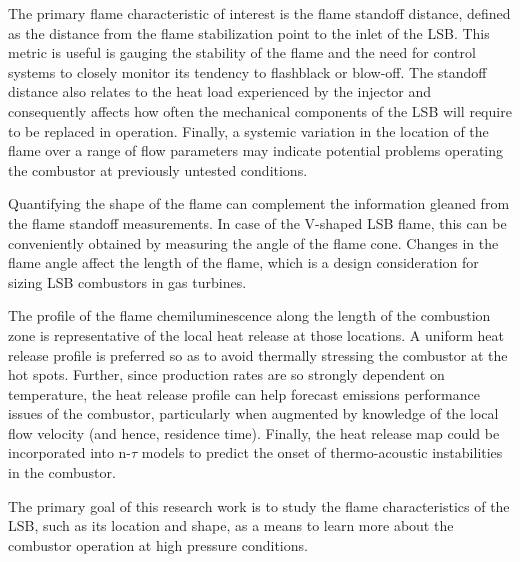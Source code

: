 The primary flame characteristic of interest is the flame standoff distance, defined as the distance from the flame stabilization point to the inlet of the LSB.
This metric is useful is gauging the stability of the flame and the need for control systems to closely monitor its tendency to flashblack or blow-off.
The standoff distance also relates to the heat load experienced by the injector and consequently affects how often the mechanical components of the LSB will require to be replaced in operation.
Finally, a systemic variation in the location of the flame over a range of flow parameters may indicate potential problems operating the combustor at previously untested conditions.

Quantifying the shape of the flame can complement the information gleaned from the flame standoff measurements.
In case of the V-shaped LSB flame, this can be conveniently obtained by measuring the angle of the flame cone.
Changes in the flame angle affect the length of the flame, which is a design consideration for sizing LSB combustors in gas turbines.

The profile of the flame chemiluminescence along the length of the combustion zone is representative of the local heat release at those locations.
A uniform heat release profile is preferred so as to avoid thermally stressing the combustor at the hot spots.
Further, since  production rates are so strongly dependent on temperature, the heat release profile can help forecast emissions performance issues of the combustor, particularly when augmented by knowledge of the local flow velocity (and hence, residence time).
Finally, the heat release map could be incorporated into n-\(\tau\) models to predict the onset of thermo-acoustic instabilities in the combustor.

The primary goal of this research work is to study the flame characteristics of the LSB, such as its location and shape, as a means to learn more about the combustor operation at high pressure conditions.

